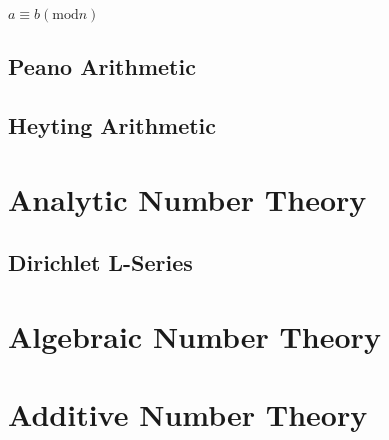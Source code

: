 $a \equiv b (\mathrm{mod} n)$



\subsection{Peano Arithmetic}\label{sec:peano_arithmetic}

\subsection{Heyting Arithmetic}\label{sec:heyting_arithmetic}



\section{Analytic Number Theory}\label{sec:analytic_number_theory}

\subsection{Dirichlet L-Series}\label{sec:l_series}



\section{Algebraic Number Theory}\label{sec:algebraic_number_theory}

\section{Additive Number Theory}\label{sec:additive_number_theory}


